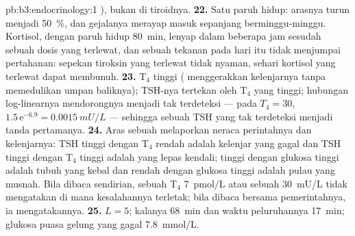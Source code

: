 \begin{solution}{pb:b3:endocrinology:1}
), bukan di tiroidnya.
\textbf{22.} Satu paruh hidup: arasnya turun menjadi \qty{50}{\%}, dan
gejalanya merayap masuk sepanjang berminggu-minggu. Kortisol, dengan paruh hidup
\qty{80}{min}, lenyap dalam beberapa jam sesudah sebuah dosis yang terlewat, dan sebuah tekanan pada
hari itu tidak menjumpai pertahanan: sepekan tiroksin yang terlewat
tidak nyaman, sehari kortisol yang terlewat dapat membunuh.
\textbf{23.} T$_{4}$ tinggi ( menggerakkan kelenjarnya tanpa memedulikan
umpan baliknya); TSH-nya tertekan oleh T$_{4}$ yang tinggi; hubungan log-linearnya
mendorongnya menjadi tak terdeteksi --- pada $T_{4} = 30$, $1.5\,\mathrm{e}^{-6.9}
= \qty{0.0015}{mU/L}$ --- sehingga sebuah TSH yang tak terdeteksi menjadi tanda pertamanya.
\textbf{24.} Aras sebuah  melaporkan neraca perintahnya dan
kelenjarnya: TSH tinggi dengan T$_{4}$ rendah adalah kelenjar yang gagal dan TSH tinggi dengan
T$_{4}$ tinggi adalah  yang lepas kendali;  tinggi dengan glukosa tinggi adalah
tubuh yang kebal dan  rendah dengan glukosa tinggi adalah pulau yang musnah.
Bila dibaca sendirian, sebuah T$_{4}$ \qty{7}{pmol/L} atau sebuah 
\qty{30}{mU/L} tidak mengatakan di mana kesalahannya terletak; bila dibaca bersama
pemerintahnya, ia mengatakannya.
\textbf{25.}  $L = 5$; kalanya \qty{68}{min} dan waktu peluruhannya
\qty{17}{min}; glukosa puasa gelung yang gagal \qty{7.8}{mmol/L}.
\end{solution}
